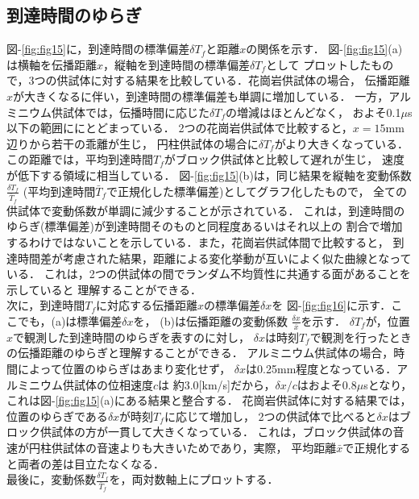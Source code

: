 \subsection{到達時間のゆらぎ}
図-\ref{fig:fig15}に，到達時間の標準偏差$\delta T_f$と距離$x$の関係を示す．
図-\ref{fig:fig15}(a)は横軸を伝播距離$x$，縦軸を到達時間の標準偏差$\delta T_f$として
プロットしたもので，3つの供試体に対する結果を比較している．花崗岩供試体の場合，
伝播距離$x$が大きくなるに伴い，到達時間の標準偏差も単調に増加している．
一方，アルミニウム供試体では，伝播時間に応じた$\delta T_f$の増減はほとんどなく，
およそ0.1$\mu$s以下の範囲ににとどまっている．
2つの花崗岩供試体で比較すると，$x=15$mm辺りから若干の乖離が生じ，
円柱供試体の場合に$\delta T_f$がより大きくなっている．
この距離では，平均到達時間$T_f$がブロック供試体と比較して遅れが生じ，
速度が低下する領域に相当している．
図-\ref{fig:fig15}(b)は，同じ結果を縦軸を変動係数$\frac{\delta T_f}{\bar{T}_f}$
(平均到達時間$\bar T_f$で正規化した標準偏差)としてグラフ化したもので，
全ての供試体で変動係数が単調に減少することが示されている．
これは，到達時間のゆらぎ(標準偏差)が到達時間そのものと同程度あるいはそれ以上の
割合で増加するわけではないことを示している．また，花崗岩供試体間で比較すると，
到達時間差が考慮された結果，距離による変化挙動が互いによく似た曲線となっている．
これは，2つの供試体の間でランダム不均質性に共通する面があることを示していると
理解することができる．\\
\hspace{\parindent}
次に，到達時間$T_f$に対応する伝播距離$x$の標準偏差$\delta x$を
図-\ref{fig:fig16}に示す．ここでも，(a)は標準偏差$\delta x$を，
(b)は伝播距離の変動係数
$\frac{\delta x}{\bar{x}}$を示す．
$\delta T_f$が，位置$x$で観測した到達時間のゆらぎを表すのに対し，
$\delta x$は時刻$T_f$で観測を行ったときの伝播距離のゆらぎと理解することができる．
アルミニウム供試体の場合，時間によって位置のゆらぎはあまり変化せず，
$\delta x$は0.25mm程度となっている．アルミニウム供試体の位相速度$c$は
約3.0[km/s]だから，$\delta x/c$はおよそ$0.8\mu$sとなり，
これは図-\ref{fig:fig15}(a)にある結果と整合する．
花崗岩供試体に対する結果では，位置のゆらぎである$\delta x$が時刻$T_f$に応じて増加し，
2つの供試体で比べると$\delta x$はブロック供試体の方が一貫して大きくなっている．
これは，ブロック供試体の音速が円柱供試体の音速よりも大きいためであり，実際，
平均距離$\bar{x}$で正規化すると両者の差は目立たなくなる．\\
\hspace{\parindent}
最後に，変動係数$\frac{\delta T_f}{\bar{T}_f}$を，両対数軸上にプロットする．
